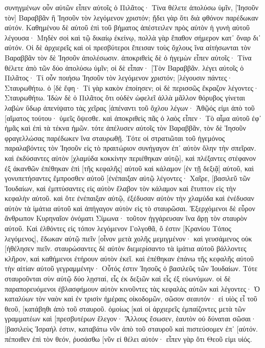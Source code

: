 συνηγμένων οὖν αὐτῶν εἶπεν αὐτοῖς ὁ Πιλᾶτος· Τίνα θέλετε ἀπολύσω ὑμῖν, [Ἰησοῦν τὸν] Βαραββᾶν ἢ Ἰησοῦν τὸν λεγόμενον χριστόν; 
ᾔδει γὰρ ὅτι διὰ φθόνον παρέδωκαν αὐτόν. 
Καθημένου δὲ αὐτοῦ ἐπὶ τοῦ βήματος ἀπέστειλεν πρὸς αὐτὸν ἡ γυνὴ αὐτοῦ λέγουσα· Μηδὲν σοὶ καὶ τῷ δικαίῳ ἐκείνῳ, πολλὰ γὰρ ἔπαθον σήμερον κατ᾽ ὄναρ δι᾽ αὐτόν. 
Οἱ δὲ ἀρχιερεῖς καὶ οἱ πρεσβύτεροι ἔπεισαν τοὺς ὄχλους ἵνα αἰτήσωνται τὸν Βαραββᾶν τὸν δὲ Ἰησοῦν ἀπολέσωσιν. 
ἀποκριθεὶς δὲ ὁ ἡγεμὼν εἶπεν αὐτοῖς· Τίνα θέλετε ἀπὸ τῶν δύο ἀπολύσω ὑμῖν; οἱ δὲ εἶπαν· [Τὸν Βαραββᾶν. 
λέγει αὐτοῖς ὁ Πιλᾶτος· Τί οὖν ποιήσω Ἰησοῦν τὸν λεγόμενον χριστόν; [λέγουσιν πάντες· Σταυρωθήτω. 
ὁ [δὲ ἔφη· Τί γὰρ κακὸν ἐποίησεν; οἱ δὲ περισσῶς ἔκραζον λέγοντες· Σταυρωθήτω. 
Ἰδὼν δὲ ὁ Πιλᾶτος ὅτι οὐδὲν ὠφελεῖ ἀλλὰ μᾶλλον θόρυβος γίνεται λαβὼν ὕδωρ ἀπενίψατο τὰς χεῖρας [ἀπέναντι τοῦ ὄχλου λέγων· Ἀθῷός εἰμι ἀπὸ τοῦ [αἵματος τούτου· ὑμεῖς ὄψεσθε. 
καὶ ἀποκριθεὶς πᾶς ὁ λαὸς εἶπεν· Τὸ αἷμα αὐτοῦ ἐφ᾽ ἡμᾶς καὶ ἐπὶ τὰ τέκνα ἡμῶν. 
τότε ἀπέλυσεν αὐτοῖς τὸν Βαραββᾶν, τὸν δὲ Ἰησοῦν φραγελλώσας παρέδωκεν ἵνα σταυρωθῇ. 
Τότε οἱ στρατιῶται τοῦ ἡγεμόνος παραλαβόντες τὸν Ἰησοῦν εἰς τὸ πραιτώριον συνήγαγον ἐπ᾽ αὐτὸν ὅλην τὴν σπεῖραν. 
καὶ ἐκδύσαντες αὐτὸν [χλαμύδα κοκκίνην περιέθηκαν αὐτῷ], 
καὶ πλέξαντες στέφανον ἐξ ἀκανθῶν ἐπέθηκαν ἐπὶ [τῆς κεφαλῆς] αὐτοῦ καὶ κάλαμον [ἐν τῇ δεξιᾷ] αὐτοῦ, καὶ γονυπετήσαντες ἔμπροσθεν αὐτοῦ [ἐνέπαιξαν αὐτῷ λέγοντες· Χαῖρε, [βασιλεῦ τῶν Ἰουδαίων, 
καὶ ἐμπτύσαντες εἰς αὐτὸν ἔλαβον τὸν κάλαμον καὶ ἔτυπτον εἰς τὴν κεφαλὴν αὐτοῦ. 
καὶ ὅτε ἐνέπαιξαν αὐτῷ, ἐξέδυσαν αὐτὸν τὴν χλαμύδα καὶ ἐνέδυσαν αὐτὸν τὰ ἱμάτια αὐτοῦ καὶ ἀπήγαγον αὐτὸν εἰς τὸ σταυρῶσαι. 
Ἐξερχόμενοι δὲ εὗρον ἄνθρωπον Κυρηναῖον ὀνόματι Σίμωνα· τοῦτον ἠγγάρευσαν ἵνα ἄρῃ τὸν σταυρὸν αὐτοῦ. 
Καὶ ἐλθόντες εἰς τόπον λεγόμενον Γολγοθᾶ, ὅ ἐστιν [Κρανίου Τόπος λεγόμενος], 
ἔδωκαν αὐτῷ πιεῖν [οἶνον μετὰ χολῆς μεμιγμένον· καὶ γευσάμενος οὐκ [ἠθέλησεν πιεῖν. 
σταυρώσαντες δὲ αὐτὸν διεμερίσαντο τὰ ἱμάτια αὐτοῦ βάλλοντες κλῆρον, 
καὶ καθήμενοι ἐτήρουν αὐτὸν ἐκεῖ. 
καὶ ἐπέθηκαν ἐπάνω τῆς κεφαλῆς αὐτοῦ τὴν αἰτίαν αὐτοῦ γεγραμμένην· Οὗτός ἐστιν Ἰησοῦς ὁ βασιλεῦς τῶν Ἰουδαίων. 
Τότε σταυροῦνται σὺν αὐτῷ δύο λῃσταί, εἷς ἐκ δεξιῶν καὶ εἷς ἐξ εὐωνύμων. 
οἱ δὲ παραπορευόμενοι ἐβλασφήμουν αὐτὸν κινοῦντες τὰς κεφαλὰς αὐτῶν 
καὶ λέγοντες· Ὁ καταλύων τὸν ναὸν καὶ ἐν τρισὶν ἡμέραις οἰκοδομῶν, σῶσον σεαυτόν· εἰ υἱὸς εἶ τοῦ θεοῦ, [κατάβηθι ἀπὸ τοῦ σταυροῦ. 
ὁμοίως [καὶ οἱ ἀρχιερεῖς ἐμπαίζοντες μετὰ τῶν γραμματέων καὶ [πρεσβυτέρων ἔλεγον· 
Ἄλλους ἔσωσεν, ἑαυτὸν οὐ δύναται σῶσαι· [βασιλεὺς Ἰσραήλ ἐστιν, καταβάτω νῦν ἀπὸ τοῦ σταυροῦ καὶ πιστεύσομεν ἐπ᾽ [αὐτόν. 
πέποιθεν ἐπὶ τὸν θεόν, ῥυσάσθω [νῦν εἰ θέλει αὐτόν· εἶπεν γὰρ ὅτι Θεοῦ εἰμι υἱός. 
